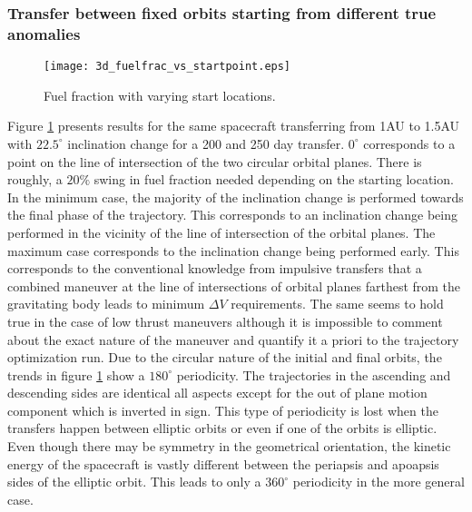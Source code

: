 \subsubsection{Transfer between fixed orbits starting from different true anomalies}
\begin{figure}[h]
	\centering\texttt{[image: 3d\_fuelfrac\_vs\_startpoint.eps]}
	\caption{Fuel fraction with varying start locations.}
	\label{3d_varystart}
\end{figure}
Figure \ref{3d_varystart} presents results for the same spacecraft transferring from 1AU to 1.5AU with $22.5^\circ$ inclination change for a 200 and 250 day transfer. $0^\circ$ corresponds to a point on the line of intersection of the two circular orbital planes. There is roughly, a $20\%$ swing in fuel fraction needed depending on the starting location. In the minimum case, the majority of the inclination change is performed towards the final phase of the trajectory. This corresponds to an inclination change being performed in the vicinity of the line of intersection of the orbital planes. The maximum case corresponds to the inclination change being performed early. This corresponds to the conventional knowledge from impulsive transfers that a combined maneuver at the line of intersections of orbital planes farthest from the gravitating body leads to minimum $\Delta V$ requirements. The same seems to hold true in the case of low thrust maneuvers although it is impossible to comment about the exact nature of the maneuver and quantify it a priori to the trajectory optimization run.
Due to the circular nature of the initial and final orbits, the trends in figure \ref{3d_varystart} show a $180^\circ$ periodicity. The trajectories in the ascending and descending sides are identical all aspects except for the out of plane motion component which is inverted in sign. This type of periodicity is lost when the transfers happen between elliptic orbits or even if one of the orbits is elliptic. Even though there may be symmetry in the geometrical orientation, the kinetic energy of the spacecraft is vastly different between the periapsis and apoapsis sides of the elliptic orbit. This leads to only a $360^\circ$ periodicity in the more general case. 
